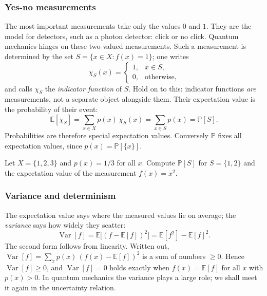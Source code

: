\subsubsection{Yes-no measurements}
The most important measurements take only the values $0$ and $1$. They are the model for detectors, such as a photon detector: click or no click. Quantum mechanics hinges on these two-valued measurements. Such a measurement is determined by the set $S = \{x \in X \colon f(x) = 1\}$; one writes
\begin{equation}
	\chi_S(x) = \begin{cases} 1, & x \in S, \\ 0, & \text{otherwise,} \end{cases}
\end{equation}
and calls $\chi_S$ the \emph{indicator function} of $S$. Hold on to this: indicator functions \emph{are} measurements, not a separate object alongside them. Their expectation value is the probability of their event:
\begin{equation}\label{eq:indicatorfunction}
	\mathbb{E}[\chi_S] = \sum_{x \in X} p(x)\, \chi_S(x) = \sum_{x \in S} p(x) = \mathbb{P}[S].
\end{equation}
Probabilities are therefore special expectation values. Conversely $\mathbb{P}$ fixes all expectation values, since $p(x) = \mathbb{P}[\{x\}]$.


\begin{exercise}
	Let $X = \{1, 2, 3\}$ and $p(x) = 1/3$ for all $x$. Compute $\mathbb{P}[S]$ for $S = \{1, 2\}$ and the expectation value of the measurement $f(x) = x^2$.
\end{exercise}

\subsubsection{Variance and determinism}
The expectation value says where the measured values lie on average; the \emph{variance} says how widely they scatter:
\begin{equation}
	\operatorname{Var}[f] = \mathbb{E}\bigl[(f - \mathbb{E}[f])^2\bigr] = \mathbb{E}[f^2] - \mathbb{E}[f]^2 .
\end{equation}
The second form follows from linearity. Written out, $\operatorname{Var}[f] = \sum_x p(x)\,(f(x) - \mathbb{E}[f])^2$ is a sum of numbers $\geq 0$. Hence $\operatorname{Var}[f] \geq 0$, and $\operatorname{Var}[f] = 0$ holds exactly when $f(x) = \mathbb{E}[f]$ for all $x$ with $p(x) > 0$. In quantum mechanics the variance plays a large role; we shall meet it again in the uncertainty relation.

